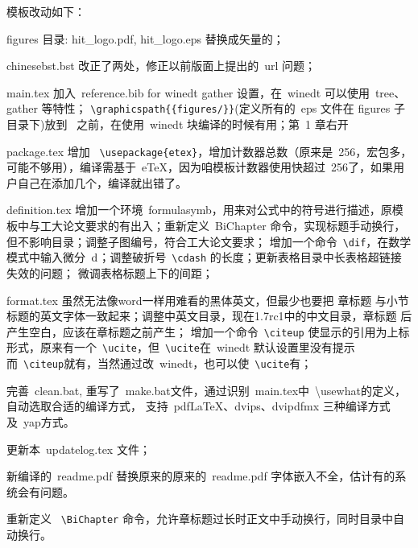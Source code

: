 模板改动如下：
\begin{hitlist}
    \item figures 目录: hit\_logo.pdf, hit\_logo.eps 替换成矢量的；
  \item chinesebst.bst 改正了两处，修正以前版面上提出的~url 问题；
  \item main.tex 加入~reference.bib for winedt gather 设置，在~winedt 可以使用~tree、gather 等特性；
    \verb|\graphicspath{{figures/}}|(定义所有的~eps 文件在 figures 子目录下)放到~\verb|| 之前，在使用~winedt 块编译的时候有用；第~1 章右开
  \item package.tex 增加 ~\verb|\usepackage{etex}|，增加计数器总数（原来是~256，宏包多，可能不够用），编译需基于~eTeX，因为咱模板计数器使用快超过~256了，如果用户自己在添加几个，编译就出错了。
  \item definition.tex 增加一个环境~formulasymb，用来对公式中的符号进行描述，原模板中与工大论文要求的有出入；重新定义~BiChapter 命令，实现标题手动换行，但不影响目录；调整子图编号，符合工大论文要求；
        增加一个命令~\verb|\dif|，在数学模式中输入微分~$\mathrm{d}$；调整破折号~\verb|\cdash| 的长度；更新表格目录中长表格超链接失效的问题；
        微调表格标题上下的间距；
  \item format.tex 虽然无法像word一样用难看的黑体英文，但最少也要把 章标题 与小节标题的英文字体一致起来；调整中英文目录，现在1.7rc1中的中文目录，章标题 后产生空白，应该在章标题之前产生；
       增加一个命令~\verb|\citeup| 使显示的引用为上标形式，原来有一个~\verb|\ucite|，但~\verb|\ucite|在~winedt 默认设置里没有提示
            而~\verb|\citeup|就有，当然通过改~winedt，也可以使~\verb|\ucite|有；
  \item 完善~clean.bat, 重写了~make.bat文件，通过识别~main.tex中~\textbackslash usewhat的定义，自动选取合适的编译方式，
       支持~pdfLaTeX、dvips、dvipdfmx 三种编译方式及~yap方式。
  \item 更新本~updatelog.tex 文件；
  \item 新编译的~readme.pdf 替换原来的原来的~readme.pdf 字体嵌入不全，估计有的系统会有问题。
  \item 重新定义 ~\verb"\BiChapter" 命令，允许章标题过长时正文中手动换行，同时目录中自动换行。
\end{hitlist}

